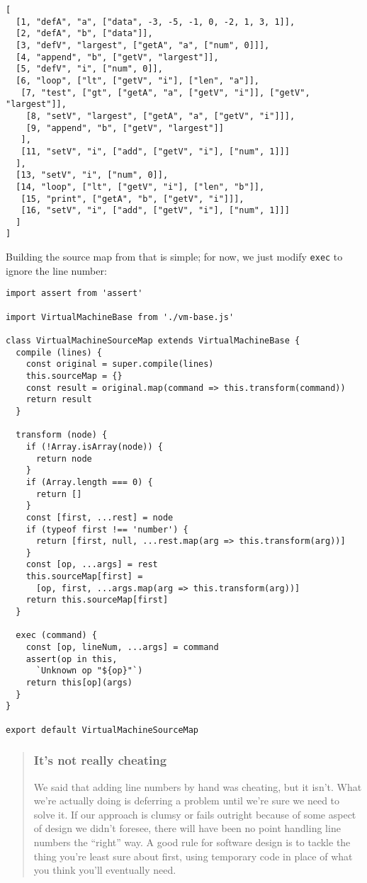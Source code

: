 \documentclass[krantzl]{krantz}
\newenvironment{callout}{\savenotes\begin{tBox}\begin{quotation}\toggletrue{inbox}\renewcommand{\thempfootnote}{\arabic{footnote}}}{\end{quotation}\vspace{\baselineskip}\end{tBox}\togglefalse{inbox}\spewnotes}
\begin{document}
\begin{lstlisting}[frame=tblr]
[
  [1, "defA", "a", ["data", -3, -5, -1, 0, -2, 1, 3, 1]],
  [2, "defA", "b", ["data"]],
  [3, "defV", "largest", ["getA", "a", ["num", 0]]],
  [4, "append", "b", ["getV", "largest"]],
  [5, "defV", "i", ["num", 0]],
  [6, "loop", ["lt", ["getV", "i"], ["len", "a"]],
   [7, "test", ["gt", ["getA", "a", ["getV", "i"]], ["getV", "largest"]],
    [8, "setV", "largest", ["getA", "a", ["getV", "i"]]],
    [9, "append", "b", ["getV", "largest"]]
   ],
   [11, "setV", "i", ["add", ["getV", "i"], ["num", 1]]]
  ],
  [13, "setV", "i", ["num", 0]],
  [14, "loop", ["lt", ["getV", "i"], ["len", "b"]],
   [15, "print", ["getA", "b", ["getV", "i"]]],
   [16, "setV", "i", ["add", ["getV", "i"], ["num", 1]]]
  ]
]
\end{lstlisting}



Building the source map from that is simple;
for now,
we just modify \texttt{exec} to ignore the line number:


\begin{lstlisting}[frame=tblr]
import assert from 'assert'

import VirtualMachineBase from './vm-base.js'

class VirtualMachineSourceMap extends VirtualMachineBase {
  compile (lines) {
    const original = super.compile(lines)
    this.sourceMap = {}
    const result = original.map(command => this.transform(command))
    return result
  }

  transform (node) {
    if (!Array.isArray(node)) {
      return node
    }
    if (Array.length === 0) {
      return []
    }
    const [first, ...rest] = node
    if (typeof first !== 'number') {
      return [first, null, ...rest.map(arg => this.transform(arg))]
    }
    const [op, ...args] = rest
    this.sourceMap[first] =
      [op, first, ...args.map(arg => this.transform(arg))]
    return this.sourceMap[first]
  }

  exec (command) {
    const [op, lineNum, ...args] = command
    assert(op in this,
      `Unknown op "${op}"`)
    return this[op](args)
  }
}

export default VirtualMachineSourceMap
\end{lstlisting}


\begin{callout}


\subsubsection*{It’s not really cheating}


We said that adding line numbers by hand was cheating,
but it isn’t.
What we’re actually doing is deferring a problem until we’re sure we need to solve it.
If our approach is clumsy or fails outright because of some aspect of design we didn’t foresee,
there will have been no point handling line numbers the “right” way.
A good rule for software design
is to tackle the thing you’re least sure about first,
using temporary code in place of what you think you’ll eventually need.

\end{callout}
\end{document}
